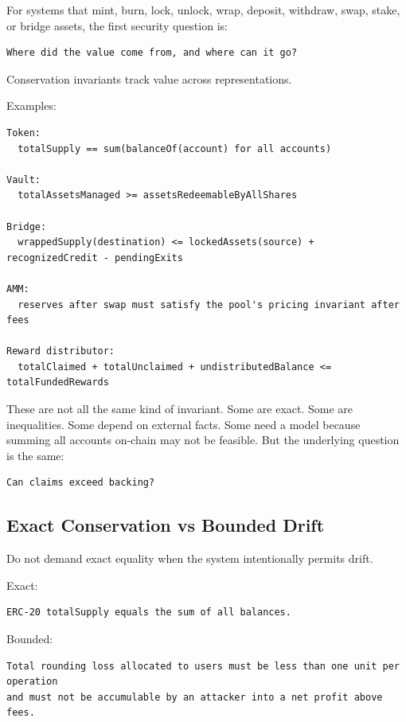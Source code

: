 For systems that mint, burn, lock, unlock, wrap, deposit, withdraw,
swap, stake, or bridge assets, the first security question is:

\begin{lstlisting}
Where did the value come from, and where can it go?
\end{lstlisting}

Conservation invariants track value across representations.

Examples:

\begin{lstlisting}
Token:
  totalSupply == sum(balanceOf(account) for all accounts)

Vault:
  totalAssetsManaged >= assetsRedeemableByAllShares

Bridge:
  wrappedSupply(destination) <= lockedAssets(source) + recognizedCredit - pendingExits

AMM:
  reserves after swap must satisfy the pool's pricing invariant after fees

Reward distributor:
  totalClaimed + totalUnclaimed + undistributedBalance <= totalFundedRewards
\end{lstlisting}

These are not all the same kind of invariant. Some are exact. Some are
inequalities. Some depend on external facts. Some need a model because
summing all accounts on-chain may not be feasible. But the underlying
question is the same:

\begin{lstlisting}
Can claims exceed backing?
\end{lstlisting}

\subsection{Exact Conservation vs Bounded Drift}

Do not demand exact equality when the system intentionally permits
drift.

Exact:

\begin{lstlisting}
ERC-20 totalSupply equals the sum of all balances.
\end{lstlisting}

Bounded:

\begin{lstlisting}
Total rounding loss allocated to users must be less than one unit per operation
and must not be accumulable by an attacker into a net profit above fees.
\end{lstlisting}

